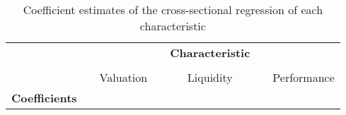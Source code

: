 \documentclass[a4paper,11pt]{report}
\begin{document}
\begin{table}[h]
\centering
    
\caption{Coefficient estimates of the cross-sectional regression of each characteristic}
\label{tab: crossregression}
\begin{tabular}{llclllc}
\toprule
                                          &  &                              &  & \multicolumn{1}{c}{\textbf{Characteristic}} &  &                              \\\cline{3-7}\\
                                          &  & Valuation                   &  & \multicolumn{1}{c}{Liquidity}               &  & Performance                  \\ \midrule
\textbf{Coefficients}                     &  &                              &  & \multicolumn{1}{c}{}                        &  &                              \\ \midrule


\end{tabular}
\end{table}
\end{document}
